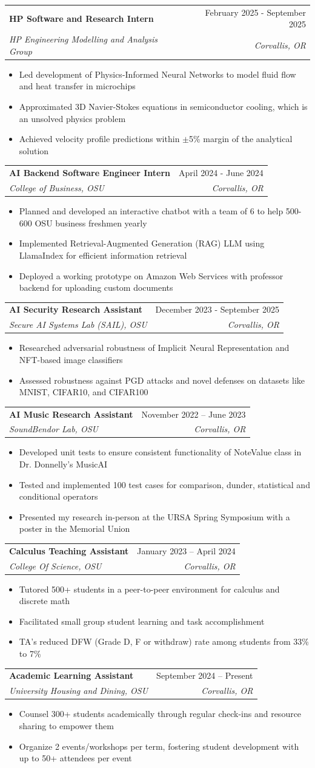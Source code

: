 \documentclass[letterpaper,11pt]{article}
\makeatletter
\newcommand{\resumeItem}[1]{%
\item\small{%
    {#1\vspace{-2pt}}%
  }%
}
\newcommand{\resumeSubheading}[4]{
  \vspace{-2pt}
\item
  \begin{tabular*}{0.97\textwidth}[t]{l@{\extracolsep{\fill}}r}
    \textbf{#1} & #2 \\
    \textit{\small#3} & \textit{\small #4} \\
  \end{tabular*}\vspace{-7pt}
}
\newcommand{\resumeItemListStart}{
\begin{itemize}}
\newcommand{\resumeItemListEnd}{
\end{itemize}\vspace{-5pt}}
\makeatother
\begin{document}
\resumeSubheading
{HP Software and Research Intern}{February 2025 - September 2025}
{HP Engineering Modelling and Analysis Group}{Corvallis, OR}
\resumeItemListStart
\resumeItem{Led development of Physics-Informed Neural Networks to model fluid flow and heat transfer in microchips}
\resumeItem{Approximated 3D Navier-Stokes equations in semiconductor cooling, which is an unsolved physics problem}
\resumeItem{Achieved velocity profile predictions within $\pm$5\% margin of the analytical solution}
\resumeItemListEnd

\resumeSubheading
{AI Backend Software Engineer Intern}{April 2024 - June 2024}
{College of Business, OSU}{Corvallis, OR}
\resumeItemListStart
\resumeItem{Planned and developed an interactive chatbot with a team of 6 to help 500-600 OSU business freshmen yearly}
\resumeItem{Implemented Retrieval-Augmented Generation (RAG) LLM using LlamaIndex for efficient information retrieval}
\resumeItem{Deployed a working prototype on Amazon Web Services with professor backend for uploading custom documents}
\resumeItemListEnd

\resumeSubheading
{AI Security Research Assistant}{December 2023 - September 2025}
{Secure AI Systems Lab (SAIL), OSU}{Corvallis, OR}
\resumeItemListStart
\resumeItem{Researched adversarial robustness of Implicit Neural Representation and NFT-based image classifiers}
\resumeItem{Assessed robustness against PGD attacks and novel defenses on datasets like MNIST, CIFAR10, and CIFAR100}
\resumeItemListEnd

\resumeSubheading
{AI Music Research Assistant}{November 2022 -- June 2023}
{SoundBendor Lab, OSU}{Corvallis, OR}
\resumeItemListStart
\resumeItem{Developed unit tests to ensure consistent functionality of NoteValue class in Dr. Donnelly's MusicAI}
\resumeItem{Tested and implemented 100 test cases for comparison, dunder, statistical and conditional operators}
\resumeItem{Presented my research in-person at the URSA Spring Symposium with a poster in the Memorial Union}
\resumeItemListEnd

\resumeSubheading
{Calculus Teaching Assistant}{January 2023 -- April 2024}
{College Of Science, OSU}{Corvallis, OR}
\resumeItemListStart
\resumeItem{Tutored 500+ students in a peer-to-peer environment for calculus and discrete math}
\resumeItem{Facilitated small group student learning and task accomplishment}
\resumeItem{TA's reduced DFW (Grade D, F or withdraw) rate among students from 33\% to 7\%}
\resumeItemListEnd

\resumeSubheading
{Academic Learning Assistant}{September 2024 -- Present}
{University Housing and Dining, OSU}{Corvallis, OR}
\resumeItemListStart
\resumeItem{Counsel 300+ students academically through regular check-ins and resource sharing to empower them}
\resumeItem{Organize 2 events/workshops per term, fostering student development with up to 50+ attendees per event}
\resumeItemListEnd
\end{document}
